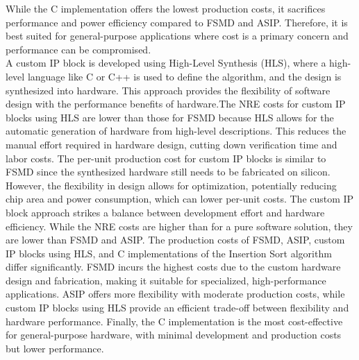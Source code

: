 \documentclass[conference]{IEEEtran}
\begin{document}
While the C implementation offers the lowest production costs, it sacrifices performance and power efficiency compared to FSMD and ASIP. Therefore, it is best suited for general-purpose applications where cost is a primary concern and performance can be compromised.\\
A custom IP block is developed using High-Level Synthesis (HLS), where a high-level language like C or C++ is used to define the algorithm, and the design is synthesized into hardware. This approach provides the flexibility of software design with the performance benefits of hardware.The NRE costs for custom IP blocks using HLS are lower than those for FSMD because HLS allows for the automatic generation of hardware from high-level descriptions. This reduces the manual effort required in hardware design, cutting down verification time and labor costs. The per-unit production cost for custom IP blocks is similar to FSMD since the synthesized hardware still needs to be fabricated on silicon. However, the flexibility in design allows for optimization, potentially reducing chip area and power consumption, which can lower per-unit costs. The custom IP block approach strikes a balance between development effort and hardware efficiency. While the NRE costs are higher than for a pure software solution, they are lower than FSMD and ASIP.
The production costs of FSMD, ASIP, custom IP blocks using HLS, and C implementations of the Insertion Sort algorithm differ significantly. FSMD incurs the highest costs due to the custom hardware design and fabrication, making it suitable for specialized, high-performance applications. ASIP offers more flexibility with moderate production costs, while custom IP blocks using HLS provide an efficient trade-off between flexibility and hardware performance. Finally, the C implementation is the most cost-effective for general-purpose hardware, with minimal development and production costs but lower performance. 
\end{document}
